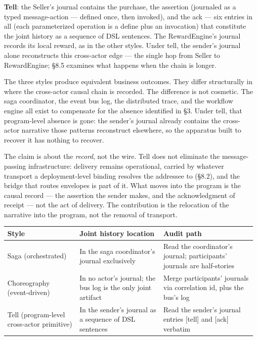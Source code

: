 \documentclass[
]{article}
\newcounter{none} %
\begin{document}
\textbf{Tell}: the Seller's journal contains the purchase, the assertion
(journaled as a typed message-action --- defined once, then invoked),
and the ack --- six entries in all (each parameterized operation is a
define plus an invocation) that constitute the joint history as a
sequence of DSL sentences. The RewardEngine's journal records its local
reward, as in the other styles. Under tell, the sender's journal alone
reconstructs this cross-actor edge --- the single hop from Seller to
RewardEngine; §8.5 examines what happens when the chain is longer.

The three styles produce equivalent business outcomes. They differ
structurally in where the cross-actor causal chain is recorded. The
difference is not cosmetic. The saga coordinator, the event bus log, the
distributed trace, and the workflow engine all exist to compensate for
the absence identified in §3. Under tell, that program-level absence is
gone: the sender's journal already contains the cross-actor narrative
those patterns reconstruct elsewhere, so the apparatus built to recover
it has nothing to recover.

The claim is about the \emph{record}, not the wire. Tell does not
eliminate the message-passing infrastructure: delivery remains
operational, carried by whatever transport a deployment-level binding
resolves the addressee to (§8.2), and the bridge that routes envelopes
is part of it. What moves into the program is the causal record --- the
assertion the sender makes, and the acknowledgment of receipt --- not
the act of delivery. The contribution is the relocation of the narrative
into the program, not the removal of transport.

{\def\LTcaptype{none} %
\begin{longtable}[]{@{}
  >{\raggedright\arraybackslash}p{}
  >{\raggedright\arraybackslash}p{}
  >{\raggedright\arraybackslash}p{}@{}}
\toprule\noalign{}
\begin{minipage}[b]{\linewidth}\raggedright
Style
\end{minipage} & \begin{minipage}[b]{\linewidth}\raggedright
Joint history location
\end{minipage} & \begin{minipage}[b]{\linewidth}\raggedright
Audit path
\end{minipage} \\
\midrule\noalign{}
\endhead
\bottomrule\noalign{}
\endlastfoot
Saga (orchestrated) & In the saga coordinator's journal exclusively &
Read the coordinator's journal; participants' journals are
half-stories \\
Choreography (event-driven) & In no actor's journal; the bus log is the
only joint artifact & Merge participants' journals via correlation id,
plus the bus's log \\
Tell (program-level cross-actor primitive) & In the sender's journal as
a sequence of DSL sentences & Read the sender's journal entries
{[}tell{]} and {[}ack{]} verbatim \\
\end{longtable}
}
\end{document}

